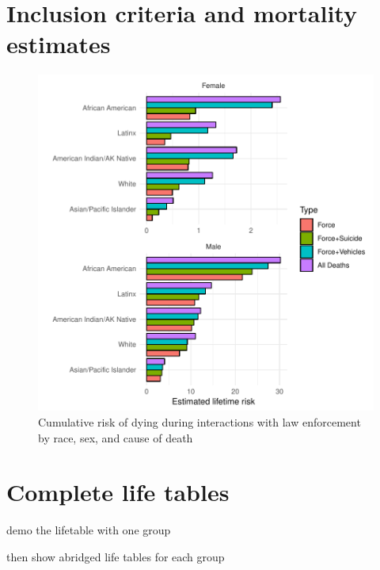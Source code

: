 \documentclass{article}
\begin{document}
\section{Inclusion criteria and mortality estimates}

\begin{figure}
	\includegraphics[width=\linewidth]{vis/death_type_c.pdf}
	\caption{Cumulative risk of dying during interactions with law enforcement by race, sex, and cause of death}
	\label{fig:death_type}
\end{figure}

\section{Complete life tables}

demo the lifetable with one group

then show abridged life tables for each group
\end{document}
